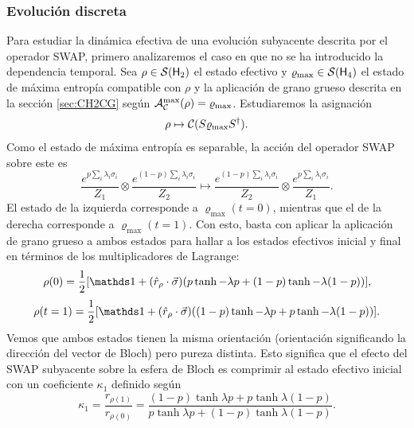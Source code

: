 \subsubsection{Evolución discreta}

Para estudiar la dinámica efectiva de una evolución subyacente descrita por el operador SWAP, primero analizaremos el caso en que no se ha introducido la dependencia temporal. Sea $\rho\in\mathcal{S}({\sf H}_{2})$ el estado efectivo y $\varrho_{\max}\in\mathcal{S}({\sf H}_{4})$ el estado de máxima entropía compatible con $\rho$ y la aplicación de grano grueso descrita en la sección \ref{sec:CH2CG} según $\mathcal{A}_{\mathcal{C}}^{\max}(\rho)=\varrho_{\max}$. Estudiaremos la asignación
\begin{equation}
  \rho\mapsto \mathcal{C}(S \varrho_{\max} S^{\dag}).
\end{equation}
Como el estado de máxima entropía es separable, la acción del operador SWAP sobre este es
\begin{equation*}
  \frac{e^{p\sum_{i}\lambda_{i}\sigma_{i}}}{Z_{1}} \otimes \frac{e^{(1-p)\sum_{i}\lambda_{i}\sigma_{i}}}{Z_{2}}\mapsto\frac{e^{(1-p)\sum_{i}\lambda_{i}\sigma_{i}}}{Z_{2}}\otimes\frac{e^{p\sum_{i}\lambda_{i}\sigma_{i}}}{Z_{1}}.
\end{equation*}
El estado de la izquierda corresponde a $\varrho_{\max}(t=0)$, mientras que el de la derecha corresponde a $\varrho_{\max}(t=1)$. Con esto, basta con aplicar la aplicación de grano grueso a ambos estados para hallar a los estados efectivos inicial y final en términos de los multiplicadores de Lagrange:
\begin{equation}
\rho(0)=\frac{1}{2}[\Id+(\hat{r}_{\rho}\cdot\vec{\sigma})(p\tanh{-\lambda p}+(1-p)\tanh{-\lambda (1-p)})],
\end{equation}
\begin{equation}
\rho(t=1)=\frac{1}{2}[\Id+(\hat{r}_{\rho}\cdot\vec{\sigma})((1-p)\tanh{-\lambda p}+p\tanh{-\lambda (1-p)})].
\end{equation}
Vemos que ambos estados tienen la misma orientación (orientación significando la dirección del vector de Bloch) pero pureza distinta. Esto significa que el efecto del \textsc{SWAP} subyacente sobre la esfera de Bloch es comprimir al estado efectivo inicial con un coeficiente $\kappa_{1}$ definido según
\begin{equation}\label{eq:SWAPFactor}
  \kappa_{1}=\frac{r_{\rho(1)}}{r_{\rho(0)}}=\frac{(1-p)\tanh{\lambda p}+p\tanh{\lambda (1-p)}}{
    p\tanh{\lambda p}+(1-p)\tanh{\lambda (1-p)}}.
\end{equation}
